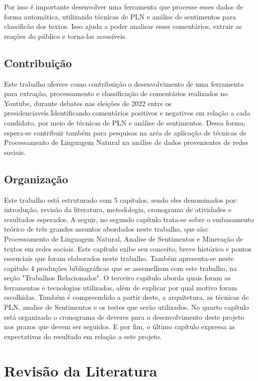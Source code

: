 \documentclass[
	12pt,				%
	openright,			%
	oneside,			%
	a4paper,			%
	english,			%
	brazil				%
	]{abntex2}
\begin{document}
Por isso é importante desenvolver uma ferramenta que processe esses dados de forma automática, utilizando técnicas de PLN e análise de sentimentos para classificão dos textos. Isso ajuda a poder analisar esses comentários, extrair as reações do público e torna-las acessíveis.

\section{Contribuição}
Este trabalho oferece como contribuição o desenvolvimento de uma ferramenta para extração, processamento e classificação de comentários realizados no Youtube, durante debates nas eleições de 2022 entre os presidenciaveis.Identificando comentários positivos e negativos em relação a cada candidato, por meio de técnicas de PLN e análise de sentimentos. Dessa forma, espera-se contribuir também para pesquisas na aréa de aplicação de técnicas de Processamento de Linguagem Natural na análise de dados provenientes de redes sociais.


\section{Organização}
Este trabalho está estruturado com 5 capítulos, sendo eles denominados por: introdução, revisão da literatura, metodologia, cronograma de atividades e resultados esperados.
A seguir, no segundo capítulo trata-se sobre o embasamento teórico de três grandes assuntos abordados neste trabalho, que são: Processamento de Linguagem Natural, Analise de Sentimentos e Mineração de textos em redes sociais. 
Este capítulo exibe seu conceito, breve histórico e pontos essenciais
que foram elaborados neste trabalho. Também apresenta-se neste capitulo 4 produções bibliográficas que se assemelham com este trabalho, na seção "Trabalhos Relacionados". O terceiro capítulo aborda quais foram as ferramentas e tecnologias utilizadas, além de explicar por qual motivo foram escolhidas. Também é compreendido a partir deste, a arquitetura, as técnicas de PLN, analise de Sentimentos e os testes que serão utilizados.
No quarto capítulo está organizado o cronograma de deveres para o desenvolvimento deste projeto nos prazos que devem ser seguidos. E por fim, o último capítulo expressa as expectativas do resultado em relação a este projeto.



\chapter{Revisão da Literatura} \label{ap_exemplos}
\end{document}

